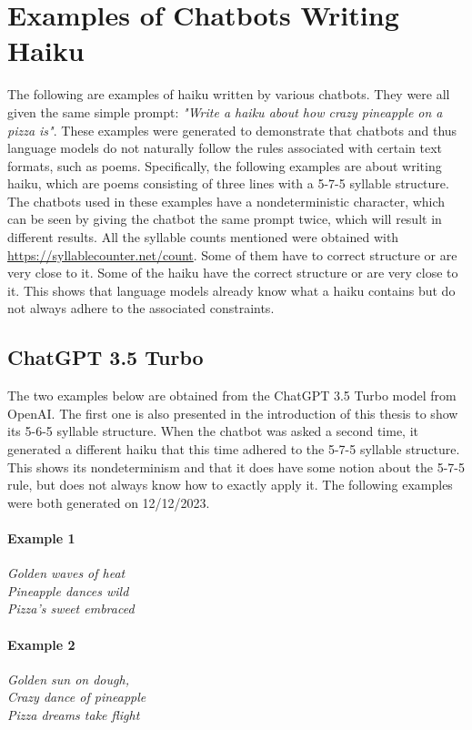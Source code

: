 \chapter{Examples of Chatbots Writing Haiku}
\label{app:A}
The following are examples of haiku written by various chatbots. They were all given the same simple prompt: \textit{"Write a haiku about how crazy pineapple on a pizza is"}. These examples were generated to demonstrate that chatbots and thus language models do not naturally follow the rules associated with certain text formats, such as poems. Specifically, the following examples are about writing haiku, which are poems consisting of three lines with a 5-7-5 syllable structure. The chatbots used in these examples have a nondeterministic character, which can be seen by giving the chatbot the same prompt twice, which will result in different results. All the syllable counts mentioned were obtained with \href{https://syllablecounter.net/count}{https://syllablecounter.net/count}. Some of them have to correct structure or are very close to it. Some of the haiku have the correct structure or are very close to it. This shows that language models already know what a haiku contains but do not always adhere to the associated constraints.

\section{ChatGPT 3.5 Turbo}
The two examples below are obtained from the ChatGPT 3.5 Turbo model\cite{ChatGPT35Turbo} from OpenAI. The first one is also presented in the introduction of this thesis to show its 5-6-5 syllable structure. When the chatbot was asked a second time, it generated a different haiku that this time adhered to the 5-7-5 syllable structure. This shows its nondeterminism and that it does have some notion about the 5-7-5 rule, but does not always know how to exactly apply it. The following examples were both generated on 12/12/2023.

\subsubsection{Example 1}
\textit{Golden waves of heat\\
Pineapple dances wild\\
Pizza's sweet embraced\\ }

\subsubsection{Example 2}
\textit{Golden sun on dough,\\
Crazy dance of pineapple \\
Pizza dreams take flight\\}

